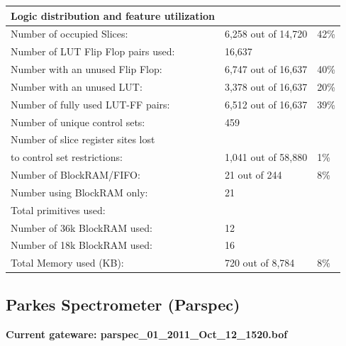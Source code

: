 \documentclass[letterpaper,10pt,english]{sphinxmanual}
\begin{document}
\begin{tabulary}{\linewidth}{|L|L|L|}
\hline
\textbf{
Logic distribution and feature utilization
} & \textbf{} & \textbf{}\\\hline

Number of occupied Slices:
 & 
6,258 out of  14,720
 & 
42\%
\\\hline

Number of LUT Flip Flop pairs used:
 & 
16,637
 & \\\hline

Number with an unused Flip Flop:
 & 
6,747 out of  16,637
 & 
40\%
\\\hline

Number with an unused LUT:
 & 
3,378 out of  16,637
 & 
20\%
\\\hline

Number of fully used LUT-FF pairs:
 & 
6,512 out of  16,637
 & 
39\%
\\\hline

Number of unique control sets:
 & 
459
 & \\\hline

Number of slice register sites lost
 &  & \\\hline

to control set restrictions:
 & 
1,041 out of  58,880
 & 
1\%
\\\hline

Number of BlockRAM/FIFO:
 & 
21 out of     244
 & 
8\%
\\\hline

Number using BlockRAM only:
 & 
21
 & \\\hline

Total primitives used:
 &  & \\\hline

Number of 36k BlockRAM used:
 & 
12
 & \\\hline

Number of 18k BlockRAM used:
 & 
16
 & \\\hline

Total Memory used (KB):
 & 
720 out of   8,784
 & 
8\%
\\\hline
\end{tabulary}



\subsection{Parkes Spectrometer (Parspec)}
\label{gateware:parkes-spectrometer-parspec}
\textbf{Current gateware: parspec\_01\_2011\_Oct\_12\_1520.bof}
\end{document}
